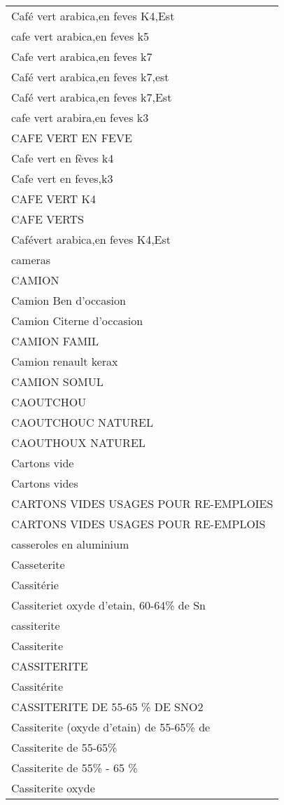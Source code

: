 \documentclass[
]{book}
\begin{document}
\begin{longtable}[t]{l}
Café vert arabica,en feves K4,Est\\
cafe vert arabica,en feves k5\\
\addlinespace
Cafe vert arabica,en feves k7\\
Café vert arabica,en feves k7,est\\
Café vert arabica,en feves k7,Est\\
cafe vert arabira,en feves k3\\
CAFE VERT EN FEVE\\
\addlinespace
Cafe vert en fèves k4\\
Cafe vert en feves,k3\\
CAFE VERT K4\\
CAFE VERTS\\
Cafévert arabica,en feves K4,Est\\
\addlinespace
cameras\\
CAMION\\
Camion Ben d'occasion\\
Camion Citerne d'occasion\\
CAMION FAMIL\\
\addlinespace
Camion renault kerax\\
CAMION SOMUL\\
CAOUTCHOU\\
CAOUTCHOUC NATUREL\\
CAOUTHOUX NATUREL\\
\addlinespace
Cartons vide\\
Cartons vides\\
CARTONS VIDES USAGES POUR RE-EMPLOIES\\
CARTONS VIDES USAGES POUR RE-EMPLOIS\\
casseroles en aluminium\\
\addlinespace
Casseterite\\
Cassitérie\\
Cassiteriet oxyde d'etain, 60-64\% de Sn\\
cassiterite\\
Cassiterite\\
\addlinespace
CASSITERITE\\
Cassitérite\\
CASSITERITE  DE 55-65 \% DE SNO2\\
Cassiterite (oxyde d'etain) de 55-65\% de\\
Cassiterite de 55-65\%\\
\addlinespace
Cassiterite de 55\% - 65 \%\\
Cassiterite oxyde\\

\end{longtable}
\end{document}
